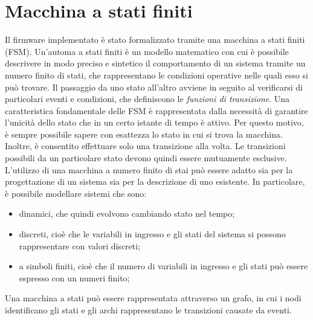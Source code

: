 \section{Macchina a stati finiti}
Il firmware implementato è stato formalizzato tramite una macchina a stati finiti (FSM). Un'automa a stati finiti è un modello matematico con cui è possibile descrivere in modo preciso e sintetico il comportamento di un sistema tramite un numero finito di stati, che rappresentano le condizioni operative nelle quali esso si può trovare. Il passaggio da uno stato all'altro avviene in seguito al verificarsi di particolari eventi e condizioni, che definiscono le \textit{funzioni di transizione}. Una caratteristica fondamentale delle FSM è rappresentata dalla necessità di garantire l'unicità dello stato che in un certo istante di tempo è attivo. Per questo motivo, è sempre possibile sapere con esattezza lo stato in cui si trova la macchina. Inoltre, è consentito effettuare solo una transizione alla volta. Le transizioni possibili da un particolare stato devono quindi essere mutuamente esclusive.
L'utilizzo di una macchina a numero finito di stai può essere adatto sia per la progettazione di un sistema sia per la descrizione di uno esistente. In particolare, è possibile modellare sistemi che sono:
\begin{itemize}
	\item dinamici, che quindi evolvono cambiando stato nel tempo;
	\item discreti, cioè che le variabili in ingresso e gli stati del sistema si possono rappresentare con valori discreti;
	\item a simboli finiti, cioè che il numero di variabili in ingresso e gli stati può essere espresso con un numeri finito;
\end{itemize}
Una macchina a stati può essere rappresentata attraverso un grafo, in cui i nodi identificano gli stati e gli archi rappresentano le transizioni causate da eventi. 

